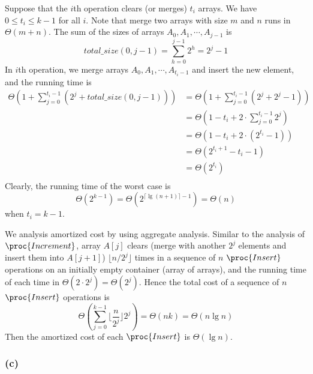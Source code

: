 Suppose that the $i$th operation clears (or merges) $t_i$ arrays. 
We have $0 \leq t_i \leq k - 1$ for all $i$.
Note that merge two arrays with size $m$ and $n$ runs in $\Theta(m + n)$.
The sum of the sizes of arrays $A_0, A_1, \cdots, A_{j-1}$ is
\begin{equation*}
    total\_size(0,j-1) = \sum\limits_{h = 0}^{j - 1} 2^h = 2^j - 1
\end{equation*}
In $i$th operation, we merge arrays $A_0, A_1, \cdots, A_{t_i-1}$
and insert the new element,
and the running time is
\begin{equation*}
\begin{split}
    \Theta(1 + \sum_{j = 0}^{t_i - 1} (2^j + total\_size(0, j - 1)))
    & = \Theta(1 + \sum_{j = 0}^{t_i - 1} (2^j + 2^j - 1)) \\
    & = \Theta(1 - t_i + 2 \cdot \sum_{j = 0}^{t_i - 1} 2^j) \\
    & = \Theta(1 - t_i + 2 \cdot (2^{t_i} - 1)) \\ 
    & = \Theta(2^{t_i + 1} - t_i - 1) \\
    & = \Theta(2^{t_i}) \\
\end{split}
\end{equation*}
Clearly, the running time of the worst case is 
\begin{equation*}
    \Theta(2^{k - 1}) = \Theta(2^{\lceil \lg (n + 1) \rceil - 1})
    = \Theta(n)
\end{equation*}
when $t_i = k - 1$.

We analysis amortized cost by using aggregate analysis.
Similar to the analysis of $\proc{Increment}$,
array $A[j]$ clears (merge with another $2^j$ elements 
and insert them into $A[j+1]$) 
$\lfloor n / 2^j \rfloor$ times
in a sequence of $n$ $\proc{Insert}$ operations on an initially
empty container (array of arrays),
and the running time of each time in $\Theta(2 \cdot 2^j) = \Theta(2^j)$.
Hence the total cost of a sequence of $n$ $\proc{Insert}$ operations is
\begin{equation*}
    \Theta(\sum\limits_{j = 0}^{k - 1} \lfloor \frac{n}{2^j} \rfloor 2^j)
    = \Theta(n k) = \Theta(n \lg n)
\end{equation*}
Then the amortized cost of each $\proc{Insert}$ is $\Theta(\lg n)$.

\subsubsection*{(c)}

